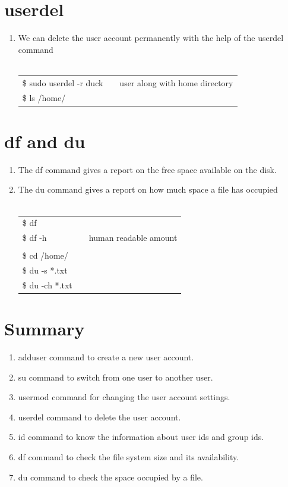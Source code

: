 \documentclass[12pt, a4paper]{report}
\begin{document}
\section{userdel}
\begin{enumerate}
\item We can delete the user account permanently with the help of the userdel command\\
\\
\begin{tabular}{|lcr|}\hline
\$ sudo userdel -r duck && user along with home directory\\
\$ ls /home/&&\\ \hline
\end{tabular}
\end{enumerate}
\section{df and du}
\begin{enumerate}
\item The df command gives a report on the free space available on the disk.
\item The du command gives a report on how much space a file has occupied\\
\\
\begin{tabular}{|lcr|}\hline
\$ df &&\\
\$ df -h && human readable amount\\
&&\\
\$ cd /home/ &&\\
\$ du -s *.txt &&\\
\$ du -ch *.txt &&\\ \hline
\end{tabular}
\end{enumerate}
\section{Summary}
\begin{enumerate}
\item adduser command to create a new user account.
\item su command to switch from one user to another user.
\item usermod command for changing the user account settings.
\item userdel command to delete the user account.
\item id command to know the information about user ids and group ids.
\item df command to check the file system size and its availability.
\item du command to check the space occupied by a file.
\end{enumerate}
%
\end{document}
